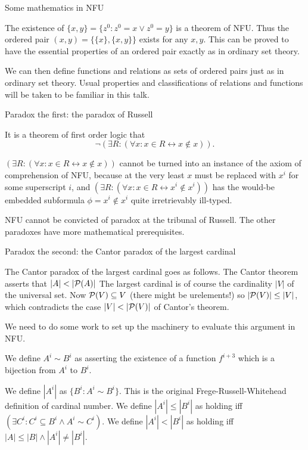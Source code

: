 \documentclass{slides}
\begin{document}
\begin{slide}

{\Large Some mathematics in NFU}

The existence of $\{x,y\} = \{z^0:z^0=x \vee z^0 = y\}$ is a theorem of NFU.  Thus the ordered pair $(x,y) = \{\{x\},\{x,y\}\}$ exists for any $x,y$.  This can be proved to have the essential properties of an ordered pair exactly as in ordinary set theory.

We can then define functions and relations as sets of ordered pairs just as in ordinary set theory.  Usual properties and classifications of relations and functions will be taken to be familiar in this talk.


\end{slide}

\begin{slide}

{\Large Paradox the first:  the paradox of Russell}

It is a theorem of first order logic that $$\neg(\exists R:(\forall x:x \in R \leftrightarrow x \not\in x)).$$

$(\exists R:(\forall x:x \in R \leftrightarrow x \not\in x))$ cannot be turned into an instance of the axiom of comprehension of NFU, because at the very least $x$ must be replaced with $x^i$
for some superscript $i$, and $(\exists R:(\forall x:x \in R \leftrightarrow x^i \not\in x^i))$ has the would-be embedded subformula $\phi = x^i \not\in x^i$ quite irretrievably ill-typed.

NFU cannot be convicted of paradox at the tribunal of Russell.  The other paradoxes have more mathematical prerequisites.


\end{slide}

\begin{slide}

{\Large Paradox the second: the Cantor paradox of the largest cardinal}

The Cantor paradox of the largest cardinal goes as follows.  The Cantor theorem asserts that $|A| < |{\cal P}(A)|$  The largest cardinal is of course the cardinality $|V|$ of the universal set.
Now ${\cal P}(V) \subseteq V$ (there might be urelements!) so $|{\cal P}(V)| \leq |V|$, which contradicts the case $|V| < |{\cal P}(V)|$ of Cantor's theorem.

We need to do some work to set up the machinery to evaluate this argument in NFU.

We define $A^i \sim B^i$ as asserting the existence of a function $f^{i+3}$ which is a bijection from $A^i$ to $B^i$.

We define $|A^i|$ as $\{B^i:A^i \sim B^i\}$.  This is the original Frege-Russell-Whitehead definition of cardinal number.  We define $|A^i| \leq |B^i|$ as holding
iff $(\exists C^i:C^i \subseteq B^i \wedge A^i \sim C^i)$.  We define $|A^i| < |B^i|$ as holding iff $|A| \leq |B| \wedge |A^i| \neq |B^i|$.

\end{slide}
\end{document}
